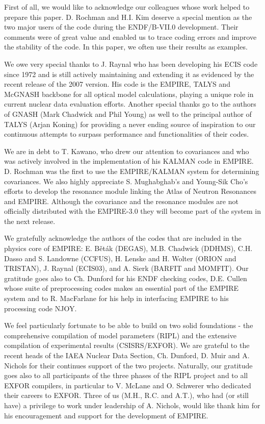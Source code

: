 First of all, we would like to acknowledge our colleagues whose work helped
to prepare this paper. D. Rochman and H.I. Kim deserve a special mention as
the two major users of the code during the ENDF/B-VII.0 development. Their
comments were of great value and enabled us to trace coding errors and improve
the stability of the code. In this paper, we often use their results as
examples.

We owe very special thanks to J. Raynal who has been developing his ECIS
code since 1972 \cite{ra72} and is still actively maintaining and extending
it as evidenced by the recent release of the 2007 version. His code is the
EMPIRE, TALYS and McGNASH backbone for all optical model calculations,
playing a unique role in current nuclear data evaluation efforts. Another
special thanks go to the authors of GNASH (Mark Chadwick and Phil Young) as well
to the principal author of TALYS (Arjan Koning) for providing a never ending source
of inspiration to our continuous attempts to surpass performance and functionalities
of their codes.

We are in debt to T. Kawano, who drew our attention to covariances and
who was
actively involved in the implementation of his KALMAN code in EMPIRE. D.
Rochman was the first to use the EMPIRE/KALMAN system for determining
covariances. We also highly appreciate S. Mughabghab's and Young-Sik Cho's
efforts to develop the resonance module linking the
Atlas of Neutron Resonances and
EMPIRE. Although the covariance and the resonance modules are not officially
distributed with the EMPIRE-3.0 they will become part of the system
in the next release.

We gratefully acknowledge the authors of the codes that are included in the
physics core of EMPIRE: E. B{\v e}t{\' a}k (DEGAS), M.B. Chadwick (DDHMS), C.H. Dasso
and S. Landowne (CCFUS), H. Lenske and H. Wolter (ORION and TRISTAN), J.
Raynal (ECIS03), and A. Sierk (BARFIT and MOMFIT). Our gratitude goes also
to Ch. Dunford for his ENDF checking codes, D.E. Cullen whose suite of
preprocessing codes makes an essential part of the EMPIRE system and to R.
MacFarlane for his help in interfacing EMPIRE to his processing code NJOY.

We feel particularly fortunate to be able to build on two solid
foundations - the comprehensive compilation of model parameters (RIPL) and
the extensive compilation of experimental results (CSISRS/EXFOR).
We are grateful to the recent heads of the IAEA Nuclear Data Section, Ch. Dunford, D.
Muir and A. Nichols for their continues
support of the two projects. Naturally, our gratitude goes also to all
participants of the three phases of the RIPL project and to all EXFOR
compilers, in particular to V. McLane and O. Schwerer who dedicated their careers to EXFOR.
Three of us (M.H., R.C. and A.T.), who had (or still have) a privilege to
work under leadership of A. Nichols, would like thank him for his
encouragement and support for the development of EMPIRE.

